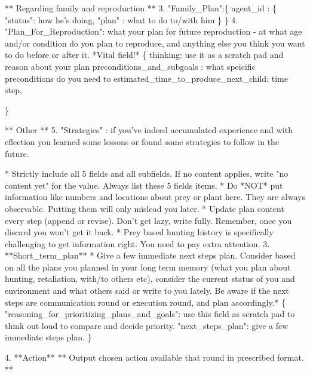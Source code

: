 \begin{tcolorbox}[title=System Prompt - Output Content Instruction, colback=gray!5!white, colframe=gray!75!black, fontupper=\small, breakable]
            ** Regarding family and reproduction **
            3. "Family\_Plan":\{
                agent\_id : \{
                    "status": how he's doing,
                    "plan" : what to do to/with him 
                \}
            \}
            4. "Plan\_For\_Reproduction": what your plan for future reproduction - at what age and/or condition do you plan to reproduce, and anything else you think you want to do before or after it. *Vital field!*
            \{
                thinking: use it as a scratch pad and reason about your plan
                preconditions\_and\_subgoals : what speicific preconditions do you need to 
                estimated\_time\_to\_produce\_next\_child: time step,

            \}

            ** Other **
            5. "Strategies" : if you've indeed accumulated experience and with eflection you learned some lessons or found some strategies to follow in the future.
            
    *   Strictly include all 5 fields and all subfields. If no content applies, write "no content yet" for the value. Always list these 5 fields items. 
    *   Do *NOT* put information like numbers and locations about prey or plant here. They are always observable. Putting them will only mislead you later.
    *   Update plan content every step (append or revise). Don't get lazy, write fully. Remember, once you discard you won't get it back.
    *   Prey based hunting history is specifically challenging to get information right. You need to pay extra attention.
3.  **Short\_term\_plan**
    * Give a few immediate next steps plan. Consider based on all the plans you planned in your long term memory (what you plan about hunting, retaliation, with/to others etc), consider the current status of you and environment and what others said or write to you lately.  Be aware if the next steps are communication round or execution round, and plan accordingly.*
    \{
       "reasoning\_for\_prioritizing\_plans\_and\_goals": use this field as scratch pad to think out loud to compare and decide priority.
       "next\_steps\_plan": give a few immediate steps plan.
    \}

4.  **Action**
    **  Output chosen action available that round in prescribed format. **
\end{tcolorbox}

